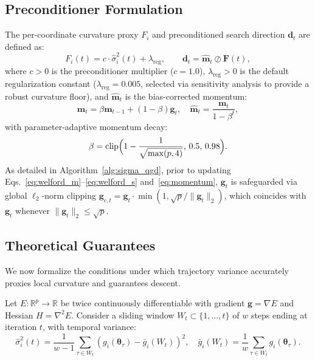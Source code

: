 \documentclass[11pt,a4paper]{article}
\begin{document}
\subsection{Preconditioner Formulation}
The per-coordinate curvature proxy $F_i$ and preconditioned search direction $\mathbf{d}_t$ are defined as:
\begin{equation}
F_i(t) = c \cdot \hat{\sigma}_i^2(t) + \lambda_{\text{reg}}, \qquad \mathbf{d}_t = \hat{\mathbf{m}}_t \oslash \mathbf{F}(t),
\label{eq:preconditioner}
\label{eq:preconditioned_update}
\end{equation}
where $c > 0$ is the preconditioner multiplier ($c = 1.0$), $\lambda_{\text{reg}} > 0$ is the default regularization constant ($\lambda_{\text{reg}} = 0.005$, selected via sensitivity analysis to provide a robust curvature floor), and $\hat{\mathbf{m}}_t$ is the bias-corrected momentum:
\begin{equation}
\mathbf{m}_t = \beta \mathbf{m}_{t-1} + (1-\beta)\mathbf{g}_t, \quad \hat{\mathbf{m}}_t = \frac{\mathbf{m}_t}{1 - \beta^t},
\label{eq:momentum}
\end{equation}
with parameter-adaptive momentum decay:
\begin{equation}
\beta = \operatorname{clip}\Bigl(1 - \frac{1}{\sqrt{\max(p, 4)}}, \, 0.5, \, 0.98\Bigr).
\label{eq:beta_formula}
\end{equation}
As detailed in Algorithm~\ref{alg:sigma_qgd}, prior to updating Eqs.~\eqref{eq:welford_m}--\eqref{eq:welford_s} and~\eqref{eq:momentum}, $\mathbf{g}_t$ is safeguarded via global $\ell_2$-norm clipping $\mathbf{g}_{c,t} = \mathbf{g}_t \cdot \min(1, \sqrt{p}/\|\mathbf{g}_t\|_2)$, which coincides with $\mathbf{g}_t$ whenever $\|\mathbf{g}_t\|_2 \le \sqrt{p}$.

\subsection{Theoretical Guarantees}
We now formalize the conditions under which trajectory variance accurately proxies local curvature and guarantees descent.

Let $E: \mathbb{R}^p \to \mathbb{R}$ be twice continuously differentiable with gradient $\mathbf{g} = \nabla E$ and Hessian $H = \nabla^2 E$. Consider a sliding window $W_t \subset \{1, \dots, t\}$ of $w$ steps ending at iteration $t$, with temporal variance:
\begin{equation}
\hat{\sigma}_i^2(t) = \frac{1}{w-1} \sum_{\tau \in W_t} \left( g_i(\boldsymbol{\theta}_\tau) - \bar{g}_i(W_t) \right)^2, \quad \bar{g}_i(W_t) = \frac{1}{w} \sum_{\tau \in W_t} g_i(\boldsymbol{\theta}_\tau).
\end{equation}
\end{document}
